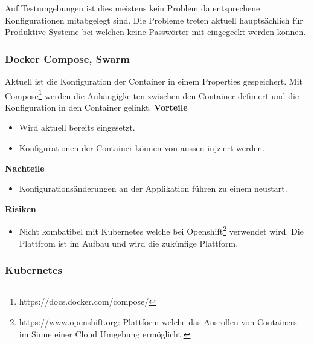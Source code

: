 Auf Testumgebungen ist dies meistens kein Problem da entsprechene Konfigurationen mitabgelegt sind. Die Probleme treten aktuell hauptsächlich für Produktive Systeme bei welchen keine Passwörter mit eingegeckt werden können.

\subsubsection{Docker Compose, Swarm}

Aktuell ist die Konfiguration der \Gls{Container} in einem Properties gespeichert. Mit Compose\footnote{https://docs.docker.com/compose/} werden die Anhängigkeiten zwischen den Container definiert und die Konfiguration in den Container gelinkt.\newline
\newline
\textbf{Vorteile}
\begin{itemize}
	\item Wird aktuell bereits eingesetzt.
	\item Konfigurationen der Container können von aussen injziert werden.
\end{itemize}
\textbf{Nachteile}
\begin{itemize}
	\item Konfigurationsänderungen an der Applikation führen zu einem neustart.
\end{itemize}
\textbf{Risiken}
\begin{itemize}
	\item Nicht kombatibel mit Kubernetes welche bei Openshift\footnote{https://www.openshift.org: Plattform welche das Ausrollen von Containers im Sinne einer Cloud Umgebung ermöglicht.}  verwendet wird. Die Plattfrom ist im Aufbau und wird die zukünfige Plattform.
\end{itemize}

\subsubsection{Kubernetes}


